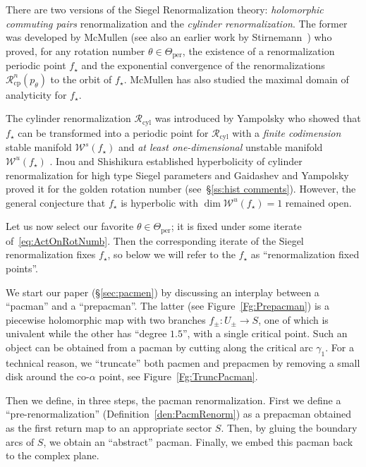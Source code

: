 \documentclass[]{amsart}
\newcommand\RR{\mathcal{R}}
\newcommand{\str}{{\star}}
\newcommand\WW{\mathcal{W}}
\theoremstyle{remark}
\numberwithin{equation}{section}
\theoremstyle{definition}
\newcommand{\per}{{\mathrm{per}}}
\newcommand{\cp}{{\mathrm{cp}}}
\newcommand{\cyl}{{\mathrm{cyl}}}
\newcommand{\ra}{\rightarrow}
\begin{document}
There are two versions of the Siegel Renormalization theory: 
 {\em holomorphic  commuting pairs} renormalization and 
the {\em cylinder renormalization}.  The former was developed by McMullen \cite{McM3} (see also an earlier work by Stirnemann~\cite{St})
who proved, for any rotation number $\theta\in \Theta_\per$,  the existence of a renormalization periodic point $f_\str$
and the exponential convergence  of the renormalizations $\RR_\cp^n (p_\theta) $  to the orbit of $ f_\str$.  
McMullen has also studied the maximal domain of analyticity for $f_\str$.



The cylinder renormalization $\RR_\cyl$  was introduced by
Yampolsky who showed that $f_\str$ can be transformed into a periodic point for $\RR_\cyl$ 
with a {\em finite codimension} stable manifold $\WW^s(f_\str)$  
and {\em at least one-dimensional} unstable manifold $\WW^u(f_\str)$ 
\cite{Ya-posmeas}. Inou and Shishikura \cite{IS} established hyperbolicity of cylinder renormalization for high type Siegel parameters and Gaidashev and Yampolsky \cite{GY} proved it for the golden rotation number (see~\S\ref{ss:hist comments}). However, the general conjecture that $f_\str$ is hyperbolic 
with $\dim \WW^u(f_\str)=1 $ remained open.


Let us now select our favorite $\theta\in \Theta_\per$;
it is fixed under some iterate of~\eqref{eq:ActOnRotNumb}.  
Then  the  corresponding iterate of the Siegel
renormalization fixes $f_\str$, so below we will refer to the
$f_\str$ as ``renormalization fixed points''.


We start our paper (\S \ref{sec:pacmen}) by discussing an interplay between 
a ``pacman'' and a ``prepacman''. The latter (see Figure~\ref{Fg:Prepacman}) is a piecewise
holomorphic map with two branches $f_\pm : U_\pm \ra S$, one of which
is univalent while the other has ``degree $1.5$'', with a single
critical point. Such an object can be obtained from a pacman by
cutting along the critical
arc $\gamma_1$. For a technical reason, we ``truncate''  both pacmen and prepacmen
by removing a small disk around the co-$\alpha$ point, see Figure~\ref{Fg:TruncPacman}. 



Then we define, in three steps,  the pacman renormalization.
 First we define a ``pre-renormalization'' (Definition~\ref{den:PacmRenorm}) as a prepacman obtained 
as the first return map to an appropriate sector $S$. 
Then, by gluing the boundary arcs of $S$,
 we obtain an ``abstract'' pacman. 
Finally, we embed this pacman back to the complex plane.
\end{document}
